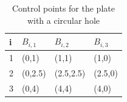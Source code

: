 \begin{table}
    \begin{center}
        \caption{Control points for the plate with a circular hole}\label{table:control_points}
        \begin{tabular}{l@{\hskip 1cm}l@{\hskip 1cm}l@{\hskip 1cm}l}
            \hline
            i & $B_{i,1} $ & $B_{i,2}$ & $B_{i,3}$ \\
            \hline
            1 & (0,1)      & (1,1)     & (1,0)     \\
            2 & (0,2.5)    & (2.5,2.5) & (2.5,0)   \\
            3 & (0,4)      & (4,4)     & (4,0)     \\
            \hline
        \end{tabular}
    \end{center}
\end{table}
